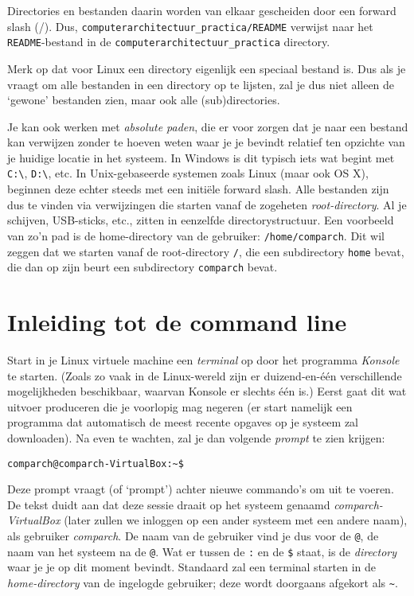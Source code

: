 \documentclass[a4paper,twoside,openany]{memoir}
\begin{document}
Directories en bestanden daarin worden van elkaar gescheiden door een forward
slash (/). Dus, \verb!computerarchitectuur_practica/README! verwijst naar
het \verb!README!-bestand in de \verb!computerarchitectuur_practica! directory.

Merk op dat voor Linux een directory eigenlijk een speciaal bestand is. Dus
als je vraagt om alle bestanden in een directory op te lijsten, zal je dus
niet alleen de `gewone' bestanden zien, maar ook alle (sub)directories.

Je kan ook werken met \emph{absolute paden}, die er voor zorgen dat je naar
een bestand kan verwijzen zonder te hoeven weten waar je je bevindt relatief
ten opzichte van je huidige locatie in het systeem. In Windows is dit typisch iets wat
begint met \verb!C:\!, \verb!D:\!, etc. In Unix-gebaseerde systemen zoals
Linux (maar ook OS X),
beginnen deze echter steeds met een initiële forward slash. Alle bestanden zijn
dus te vinden via verwijzingen die starten vanaf de zogeheten
\emph{root-directory}. Al je schijven, USB-sticks, etc., zitten in eenzelfde
directorystructuur. Een voorbeeld van zo'n pad is de
home-directory van de gebruiker: \verb!/home/comparch!. Dit wil zeggen dat we starten vanaf de
root-directory \verb!/!, die een subdirectory \verb!home! bevat, die dan op zijn
beurt een subdirectory \verb!comparch! bevat.


\chapter{Inleiding tot de command line}

Start in je Linux virtuele machine een \emph{terminal} op door het programma
\emph{Konsole} te starten. (Zoals zo vaak in de Linux-wereld zijn er
duizend-en-één verschillende mogelijkheden beschikbaar, waarvan Konsole er
slechts één is.) Eerst gaat dit wat uitvoer produceren die je voorlopig mag
negeren (er start namelijk een programma dat automatisch de meest recente
opgaves op je systeem zal downloaden). Na even te wachten, zal je dan volgende
\emph{prompt} te zien krijgen:

\begin{verbatim}
comparch@comparch-VirtualBox:~$ 
\end{verbatim}

Deze prompt vraagt (of `prompt') achter nieuwe commando's om uit te voeren. De
tekst duidt aan dat deze sessie draait op het systeem genaamd
\emph{comparch-VirtualBox} (later zullen we inloggen op een ander systeem met een
andere naam), als gebruiker \emph{comparch}. De naam van de gebruiker vind je dus
voor de \texttt{@}, de naam van het systeem na de \texttt{@}. Wat er tussen de
\texttt{:} en de \texttt{\$} staat, is de \emph{directory} waar je je op dit
moment bevindt. Standaard zal een terminal starten in de \emph{home-directory}
van de ingelogde gebruiker; deze wordt doorgaans afgekort als \texttt{\~}.
\end{document}
